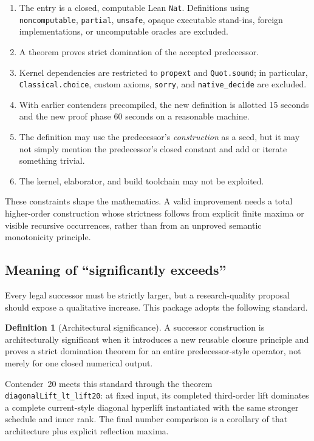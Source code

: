 \documentclass[11pt]{article}
\theoremstyle{definition}
\newtheorem{definition}[theorem]{Definition}
\theoremstyle{remark}
\newcommand{\leanname}[1]{\nolinkurl{#1}}
\begin{document}
\begin{enumerate}[leftmargin=*,itemsep=0.35em]
\item The entry is a closed, computable Lean \leanname{Nat}.  Definitions using
  \leanname{noncomputable}, \leanname{partial}, \leanname{unsafe}, opaque
  executable stand-ins, foreign implementations, or uncomputable oracles are
  excluded.
\item A theorem proves strict domination of the accepted predecessor.
\item Kernel dependencies are restricted to \leanname{propext} and
  \leanname{Quot.sound}; in particular, \leanname{Classical.choice}, custom
  axioms, \leanname{sorry}, and \leanname{native_decide} are excluded.
\item With earlier contenders precompiled, the new definition is allotted
  15 seconds and the new proof phase 60 seconds on a reasonable machine.
\item The definition may use the predecessor's \emph{construction} as a seed,
  but it may not simply mention the predecessor's closed constant and add or
  iterate something trivial.
\item The kernel, elaborator, and build toolchain may not be exploited.
\end{enumerate}

These constraints shape the mathematics.  A valid improvement needs a total
higher-order construction whose strictness follows from explicit finite
maxima or visible recursive occurrences, rather than from an unproved semantic
monotonicity principle.

\subsection{Meaning of ``significantly exceeds''}

Every legal successor must be strictly larger, but a research-quality proposal
should expose a qualitative increase.  This package adopts the following
standard.

\begin{definition}[Architectural significance]
A successor construction is architecturally significant when it introduces a
new reusable closure principle and proves a strict domination theorem for an
entire predecessor-style operator, not merely for one closed numerical output.
\end{definition}

Contender~20 meets this standard through the theorem
\leanname{diagonalLift_lt_lift20}: at fixed input, its completed third-order
lift dominates a complete current-style diagonal hyperlift instantiated with
the same stronger schedule and inner rank.  The final number comparison is a
corollary of that architecture plus explicit reflection maxima.
\end{document}
